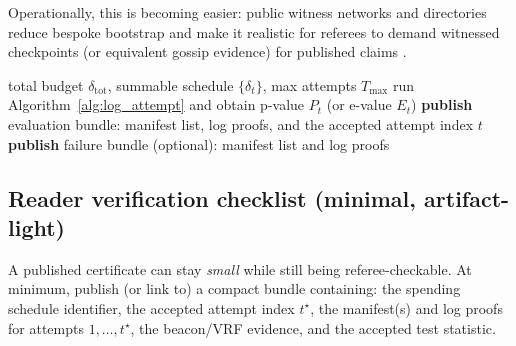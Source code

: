 \documentclass[11pt]{article}
\begin{document}
Operationally, this is becoming easier: public witness networks and directories reduce bespoke bootstrap and make it realistic for referees to demand witnessed checkpoints (or equivalent gossip evidence) for published claims \cite{witness_network_blog_2024,trustfabric_witnesses_2025,filippo_keyserver_tlog_2025}.



\begin{algorithm}[t]
\caption{Notarized evaluation gate (approve-once)}\label{alg:release_gate}
\begin{algorithmic}[1]
\Require total budget $\delta_{\text{tot}}$, summable schedule $\{\delta_t\}$, max attempts $T_{\max}$
  \State run Algorithm~\ref{alg:log_attempt} and obtain p-value $P_t$ (or e-value $E_t$)
     \State \textbf{publish} evaluation bundle: manifest list, log proofs, and the accepted attempt index $t$
     \State \Return
  \EndIf
\EndFor
\State \textbf{publish} failure bundle (optional): manifest list and log proofs
\end{algorithmic}
\end{algorithm}
\subsection{Reader verification checklist (minimal, artifact-light)}
A published certificate can stay \emph{small} while still being referee-checkable.
At minimum, publish (or link to) a compact bundle containing: the spending schedule identifier, the accepted attempt index $t^\star$,
the manifest(s) and log proofs for attempts $1,\dots,t^\star$, the beacon/VRF evidence, and the accepted test statistic.
\end{document}

